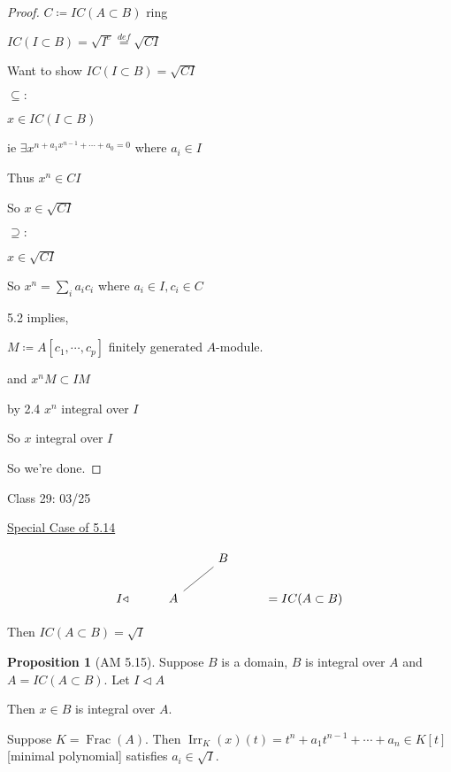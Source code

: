 \documentclass{article}
\theoremstyle{definition}
\newtheorem{proposition}{Proposition}
\newcommand{\Frac}{\operatorname{Frac}}
\begin{document}
\begin{proof}
    \(C\coloneqq IC(A \subset B)\) ring

    \(IC(I \subset B)=\sqrt{I^e} \overset{def}{=} \sqrt{CI} \)  
    
    Want to show \(IC(I \subset B)=\sqrt{CI}\)
    
    \(\subseteq :\) 

    \(x\in IC(I \subset B)\)
    
    ie \(\exists x^{n+a_1 x^{n-1} + \cdots + a_0 = 0} \) where \(a_i\in I\) 
    
    Thus \(x^n\in CI\) 

    So \(x\in \sqrt{CI}\) 

    \(\supseteq :\)
    
    \(x\in \sqrt{CI}\)
    
    So \(x^n = \sum_{i} a_i c_i\) where \(a_i\in I, c_i\in C\)
    
    5.2 implies,

    \(M\coloneqq A[c_1,\cdots,c_p]\) finitely generated \(A\)-module.
    
    and \(x^n M \subset I M\)
    
    by 2.4 \(x^n\) integral over \(I\) 

    So \(x\) integral over \(I\)

    So we're done.
\end{proof}

\hrulefill

Class 29: 03/25

\underline{Special Case of 5.14} 

\[
    \begin{tikzcd}
        & & B \ar[ld, no head] & \\
        I \triangleleft & A & & = IC(A \subset B)
    \end{tikzcd}
\]

Then \(IC(A \subset B) = \sqrt{I}\) 

\begin{proposition}
    [AM 5.15]

    Suppose \(B\) is a domain, \(B\) is integral over \(A\) and \(A=IC(A \subset B)\). Let \(I \triangleleft A\)
    
    Then \(x\in B\) is integral over \(A\).

    Suppose \(K = \Frac(A)\). Then \(\operatorname{Irr}_K(x)(t) = t^n + a_1 t^{n-1} + \cdots + a_n \in K[t]\) [minimal polynomial] satisfies \(a_i\in \sqrt{I}\).  
\end{proposition}
\end{document}
